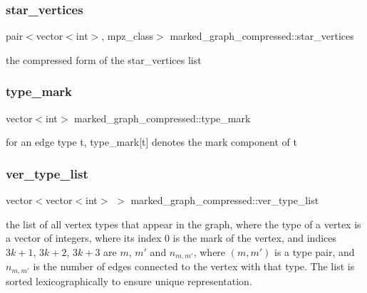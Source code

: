 \subsubsection{\texorpdfstring{star\+\_\+vertices}{star\_vertices}}
{\footnotesize\ttfamily pair$<$vector$<$int$>$, mpz\+\_\+class$>$ marked\+\_\+graph\+\_\+compressed\+::star\+\_\+vertices}



the compressed form of the star\+\_\+vertices list 

\mbox{\label{classmarked__graph__compressed_a86b00223525703e973415cbc9c94da68}} 
\subsubsection{\texorpdfstring{type\+\_\+mark}{type\_mark}}
{\footnotesize\ttfamily vector$<$int$>$ marked\+\_\+graph\+\_\+compressed\+::type\+\_\+mark}



for an edge type t, type\+\_\+mark\mbox{[}t\mbox{]} denotes the mark component of t 

\mbox{\label{classmarked__graph__compressed_af2e3e55223d436628a02758dfae88493}} 
\subsubsection{\texorpdfstring{ver\+\_\+type\+\_\+list}{ver\_type\_list}}
{\footnotesize\ttfamily vector$<$vector$<$int$>$ $>$ marked\+\_\+graph\+\_\+compressed\+::ver\+\_\+type\+\_\+list}



the list of all vertex types that appear in the graph, where the type of a vertex is a vector of integers, where its index 0 is the mark of the vertex, and indices $3k+1$, $3k+2$, $3k+3$ are $m$, $m'$ and $n_{m,m'}$, where $(m,m')$ is a type pair, and $n_{m,m'}$ is the number of edges connected to the vertex with that type. The list is sorted lexicographically to ensure unique representation. 

